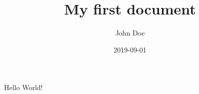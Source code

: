 \documentclass{article}
\title{My first document}
\date{2019-09-01}
\author{John Doe}
\begin{document}
   \maketitle
   \newpage
   Hello World!
\end{document}
